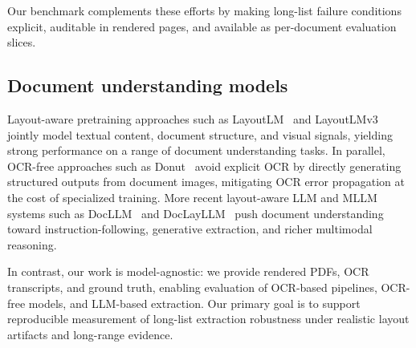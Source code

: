 Our benchmark complements these efforts by making long-list failure conditions explicit, auditable in rendered pages, and available as per-document evaluation slices.

\subsection{Document understanding models}
Layout-aware pretraining approaches such as LayoutLM~\cite{xu2020layoutlm} and LayoutLMv3~\cite{huang2022layoutlmv3} jointly model textual content, document structure, and visual signals, yielding strong performance on a range of document understanding tasks. In parallel, OCR-free approaches such as Donut~\cite{kim2022donut} avoid explicit OCR by directly generating structured outputs from document images, mitigating OCR error propagation at the cost of specialized training. More recent layout-aware LLM and MLLM systems such as DocLLM~\cite{wang2024docllm} and DocLayLLM~\cite{liao2024doclayllm} push document understanding toward instruction-following, generative extraction, and richer multimodal reasoning.

In contrast, our work is model-agnostic: we provide rendered PDFs, OCR transcripts, and ground truth, enabling evaluation of OCR-based pipelines, OCR-free models, and LLM-based extraction. Our primary goal is to support reproducible measurement of long-list extraction robustness under realistic layout artifacts and long-range evidence.
